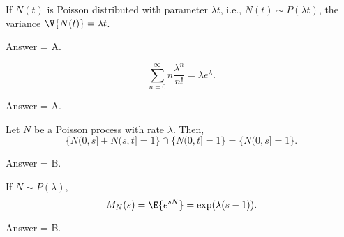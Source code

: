 \begin{exercise}[201802]
If $N(t)$ is Poisson distributed with parameter $\lambda t$, i.e., $N(t) \sim P(\lambda t)$, the variance $\V{N(t)} = \lambda t$. 
\begin{solution}
Answer = A.
\end{solution}
\end{exercise}

\begin{exercise}[201802]
\begin{equation*}
\sum_{n=0}^\infty n \frac{\lambda^n}{n!} = \lambda e^{\lambda}.
\end{equation*}
\begin{solution}
Answer = A.
\end{solution}
\end{exercise}

\begin{exercise}[201802]
Let $N$ be a Poisson process with rate $\lambda$. Then,
 \begin{equation*}
\{N(0,s]+N(s,t]=1\}\cap\{N(0,t]=1\} = \{N(0,s]=1\}.
 \end{equation*}
\begin{solution}
Answer = B.
\end{solution}
\end{exercise}

\begin{exercise}[201802]
If $N\sim P(\lambda)$, 
\begin{equation*}
M_{N}(s) = \E{e^{s N}} =\exp(\lambda(s - 1)).
\end{equation*}

\begin{solution}
Answer = B.
\end{solution}
\end{exercise}

